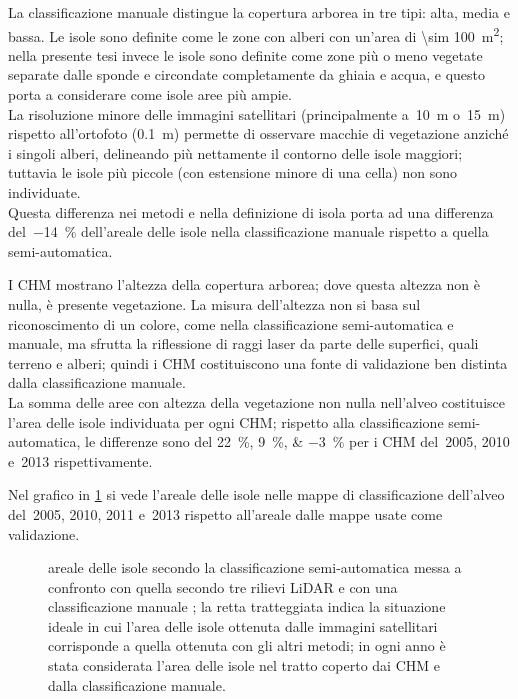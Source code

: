 \begin{aenumerate}
	\item La classificazione manuale distingue la copertura arborea in tre tipi: alta, media e bassa.
	Le isole sono definite come le zone con alberi con un'area di \SI{\sim 100}{\m\tothe{2}}; nella presente tesi invece le isole sono definite come zone più o meno vegetate separate dalle sponde e circondate completamente da ghiaia e acqua, e questo porta a considerare come isole aree più ampie.
	\\
	La risoluzione minore delle immagini satellitari (principalmente a~\SI{10}{\m} o~\SI{15}{\m}) rispetto all'ortofoto (\SI{0.1}{\m}) permette di osservare macchie di vegetazione anziché i singoli alberi, delineando più nettamente il contorno delle isole maggiori; tuttavia le isole più piccole (con estensione minore di una cella) non sono individuate.
	\\
	Questa differenza nei metodi e nella definizione di isola porta ad una differenza del~\SI{-14}{\percent} dell'areale delle isole nella classificazione manuale rispetto a quella semi-automatica.
	\item I CHM mostrano l'altezza della copertura arborea; dove questa altezza non è nulla, è presente vegetazione.
	La misura dell'altezza non si basa sul riconoscimento di un colore, come nella classificazione semi-automatica e manuale, ma sfrutta la riflessione di raggi laser da parte delle superfici, quali terreno e alberi; quindi i CHM costituiscono una fonte di validazione ben distinta dalla classificazione manuale.
	\\
	La somma delle aree con altezza della vegetazione non nulla nell'alveo costituisce l'area delle isole individuata per ogni CHM; rispetto alla classificazione semi-automatica, le differenze sono del \SIlist[list-separator = {, }, list-final-separator = { e }, retain-explicit-plus]{+22;+9;-3}{\percent} per i CHM del~2005, 2010 e~2013 rispettivamente.
\end{aenumerate}
%
Nel grafico in \cref{graph:validazione-class-is-fl} si vede l'areale delle isole nelle mappe di classificazione dell'alveo del~2005, 2010, 2011 e~2013 rispetto all'areale dalle mappe usate come validazione.
%
\begin{figure}
	\centering
	
	\caption[validazione della classificazione considerando le aree delle isole]{areale delle isole secondo la classificazione semi-automatica messa a confronto con quella secondo tre rilievi LiDAR e con una classificazione manuale ; la retta tratteggiata indica la situazione ideale in cui l'area delle isole ottenuta dalle immagini satellitari corrisponde a quella ottenuta con gli altri metodi; in ogni anno è stata considerata l'area delle isole nel tratto coperto dai CHM e dalla classificazione manuale.}
	\label{graph:validazione-class-is-fl}
\end{figure}

